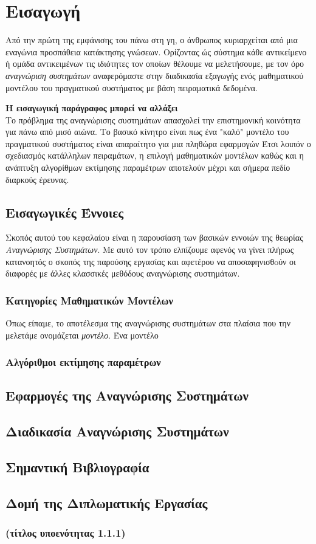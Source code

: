 \chapter{Εισαγωγή}

Από την πρώτη της εμφάνισης του πάνω στη γη, ο άνθρωπος κυριαρχείται από μια εναγώνια προσπάθεια κατάκτησης γνώσεων. Ορίζοντας ώς σύστημα κάθε αντικείμενο ή ομάδα αντικειμένων τις ιδιότητες τον οποίων θέλουμε να μελετήσουμε, με τον όρο \textit{αναγνώριση συστημάτων} αναφερόμαστε στην διαδικασία εξαγωγής ενός μαθηματικού μοντέλου του πραγματικού συστήματος με βάση πειραματικά δεδομένα. 

\textbf{Η εισαγωγική παράγραφος μπορεί να αλλάξει} \\
Το πρόβλημα της αναγνώρισης συστημάτων απασχολεί την επιστημονική κοινότητα για πάνω από μισό αιώνα. Το βασικό κίνητρο είναι πως ένα "καλό" μοντέλο του πραγματικού συστήματος είναι απαραίτητο για μια πληθώρα εφαρμογών %
Έτσι λοιπόν ο σχεδιασμός κατάλληλων πειραμάτων, η επιλογή μαθηματικών μοντέλων καθώς και η ανάπτυξη αλγορίθμων εκτίμησης παραμέτρων αποτελούν  μέχρι και σήμερα πεδίο διαρκούς έρευνας.

\section{Εισαγωγικές Έννοιες}
Σκοπός αυτού του κεφαλαίου είναι η παρουσίαση των βασικών εννοιών της θεωρίας \textit{Αναγνώρισης Συστημάτων}. Με αυτό τον τρόπο ελπίζουμε αφενός να γίνει πλήρως κατανοητός ο σκοπός της παρούσης εργασίας και αφετέρου να αποσαφηνισθoύν οι διαφορές με άλλες κλασσικές μεθόδους αναγνώρισης συστημάτων.

\subsection{Κατηγορίες Μαθηματικών Μοντέλων}
Όπως είπαμε, το αποτέλεσμα της αναγνώρισης συστημάτων στα πλαίσια που την μελετάμε ονομάζεται \textit{μοντέλο}. Ένα μοντέλο 

\subsection{Αλγόριθμοι εκτίμησης παραμέτρων}


\section{Εφαρμογές της Αναγνώρισης Συστημάτων}

\section{Διαδικασία Αναγνώρισης Συστημάτων}

\section{Σημαντική Βιβλιογραφία}

\section{Δομή της Διπλωματικής Εργασίας}

\subsection{(τίτλος υποενότητας 1.1.1)}


